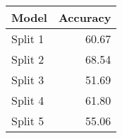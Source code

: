 \begin{tabular}{lr}
    \toprule
    Model & Accuracy \\
    \midrule
    Split 1 & 60.67 \\
    Split 2 & 68.54 \\
    Split 3 & 51.69 \\
    Split 4 & 61.80 \\
    Split 5 & 55.06 \\
    \bottomrule
\end{tabular}
    